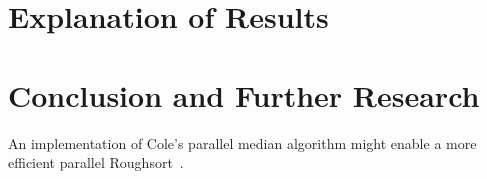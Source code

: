 \documentclass[letterpaper, 12pt]{article}
\let\supercite\cite
\renewcommand{\cite}[1]{\textnormal{~\supercite{#1}}}
\begin{document}
\begin{sidewaysfigure}

\vspace{-4ex}
\caption{\label{fig:k15}{\em
  Sort Runtimes over Arrays of Length $n\cdot 10^6$, $k = 15$
}}
\end{sidewaysfigure}

\begin{sidewaysfigure}

\vspace{-4ex}
\caption{\label{fig:n750k}{\em
  Sort Runtimes over Arrays of Radius $k$, $n = 0.75\cdot 10^6$
}}
\end{sidewaysfigure}

\begin{sidewaysfigure}

\vspace{-4ex}
\caption{\label{fig:n1250k}{\em
  Sort Runtimes over Arrays of Radius $k$, $n = 1.25\cdot 10^6$
}}
\end{sidewaysfigure}

\clearpage
\section{Explanation of Results}

\section{Conclusion and Further Research}
An implementation of Cole's parallel median algorithm might enable a more efficient parallel Roughsort\cite{cole85}.

\clearpage

\nocite{*}
\end{document}
